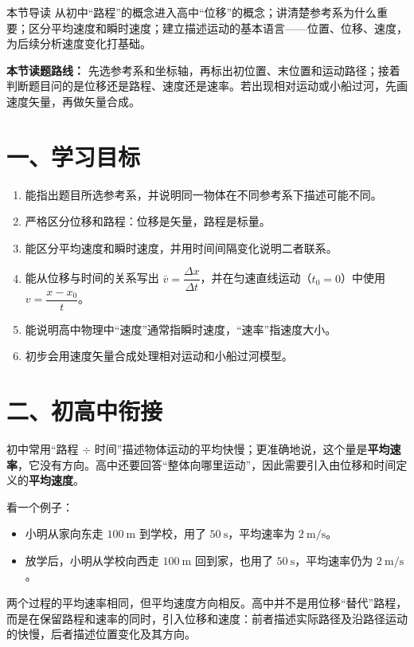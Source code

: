 
\begin{learningbox}{本节导读}
从初中“路程”的概念进入高中“位移”的概念；讲清楚参考系为什么重要；区分平均速度和瞬时速度；建立描述运动的基本语言——位置、位移、速度，为后续分析速度变化打基础。
\end{learningbox}

\textbf{本节读题路线：} 先选参考系和坐标轴，再标出初位置、末位置和运动路径；接着判断题目问的是位移还是路程、速度还是速率。若出现相对运动或小船过河，先画速度矢量，再做矢量合成。

\section*{一、学习目标}

\begin{enumerate}
  \item 能指出题目所选参考系，并说明同一物体在不同参考系下描述可能不同。
  \item 严格区分位移和路程：位移是矢量，路程是标量。
  \item 能区分平均速度和瞬时速度，并用时间间隔变化说明二者联系。
  \item 能从位移与时间的关系写出 $\bar v = \dfrac{\Delta x}{\Delta t}$，并在匀速直线运动（$t_0=0$）中使用 $v=\dfrac{x-x_0}{t}$。
  \item 能说明高中物理中“速度”通常指瞬时速度，“速率”指速度大小。
  \item 初步会用速度矢量合成处理相对运动和小船过河模型。
\end{enumerate}

\section*{二、初高中衔接}

初中常用“路程 $\div$ 时间”描述物体运动的平均快慢；更准确地说，这个量是\textbf{平均速率}，它没有方向。高中还要回答“整体向哪里运动”，因此需要引入由位移和时间定义的\textbf{平均速度}。

\begin{samepage}
看一个例子：
\begin{itemize}
  \item 小明从家向东走 $100\ \mathrm{m}$ 到学校，用了 $50\ \mathrm{s}$，平均速率为 $2\ \mathrm{m/s}$。
  \item 放学后，小明从学校向西走 $100\ \mathrm{m}$ 回到家，也用了 $50\ \mathrm{s}$，平均速率仍为 $2\ \mathrm{m/s}$。
\end{itemize}
两个过程的平均速率相同，但平均速度方向相反。高中并不是用位移“替代”路程，而是在保留路程和速率的同时，引入位移和速度：前者描述实际路径及沿路径运动的快慢，后者描述位置变化及其方向。
\end{samepage}


